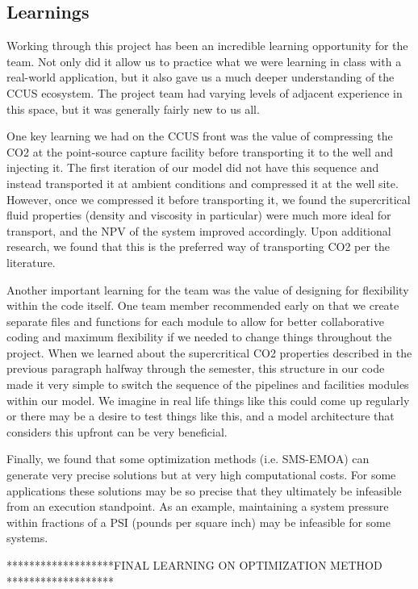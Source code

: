 \documentclass[balance,upint,subscriptcorrection,varvw,mathalfa=cal=boondoxo,spanish,french,vietnamese,russian,greek,pdf-a,colorlinks]{asmeconf}
\begin{document}
\subsection{Learnings}
Working through this project has been an incredible learning opportunity for the team. Not only did it allow us to practice what we were learning in class with a real-world application, but it also gave us a much deeper understanding of the CCUS ecosystem. The project team had varying levels of adjacent experience in this space, but it was generally fairly new to us all.

One key learning we had on the CCUS front was the value of compressing the CO2 at the point-source capture facility before transporting it to the well and injecting it. The first iteration of our model did not have this sequence and instead transported it at ambient conditions and compressed it at the well site. However, once we compressed it before transporting it, we found the supercritical fluid properties (density and viscosity in particular) were much more ideal for transport, and the NPV of the system improved accordingly. Upon additional research, we found that this is the preferred way of transporting CO2 per the literature.

Another important learning for the team was the value of designing for flexibility within the code itself. One team member recommended early on that we create separate files and functions for each module to allow for better collaborative coding and maximum flexibility if we needed to change things throughout the project. When we learned about the supercritical CO2 properties described in the previous paragraph halfway through the semester, this structure in our code made it very simple to switch the sequence of the pipelines and facilities modules within our model. We imagine in real life things like this could come up regularly or there may be a desire to test things like this, and a model architecture that considers this upfront can be very beneficial.

Finally, we found that some optimization methods (i.e. SMS-EMOA) can generate very precise solutions but at very high computational costs.  For some applications these solutions may be so precise that they ultimately be infeasible from an execution standpoint.  As an example, maintaining a system pressure within fractions of a PSI (pounds per square inch) may be infeasible for some systems.

*******************FINAL LEARNING ON OPTIMIZATION METHOD *******************
\end{document}
